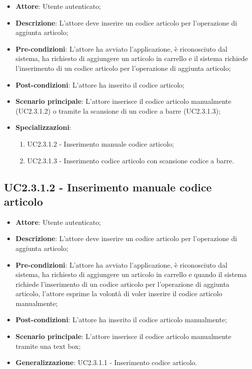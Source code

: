 \begin{itemize}
	\item \textbf{Attore}: Utente autenticato;
	\item \textbf{Descrizione}: L'attore deve inserire un codice articolo per l'operazione di aggiunta articolo;
	\item \textbf{Pre-condizioni}: L'attore ha avviato l'applicazione, è riconosciuto dal sistema, ha richiesto di aggiungere un articolo in carrello e il sistema richiede l'inserimento di un codice articolo per l'operazione di aggiunta articolo;
	\item \textbf{Post-condizioni}: L'attore ha inserito il codice articolo;
	\item \textbf{Scenario principale}: L'attore inserisce il codice articolo manualmente (UC2.3.1.2) o tramite la scansione di un codice a barre (UC2.3.1.3);
	\item \textbf{Specializzazioni}: 
		\begin{enumerate}
			\item UC2.3.1.2 - Inserimento manuale codice articolo;
			\item UC2.3.1.3 - Inserimento codice articolo con scansione codice a barre.
		\end{enumerate}		 
\end{itemize}

\subsection{UC2.3.1.2 - Inserimento manuale codice articolo}

\begin{itemize}
	\item \textbf{Attore}: Utente autenticato;
	\item \textbf{Descrizione}: L'attore deve inserire un codice articolo per l'operazione di aggiunta articolo;
	\item \textbf{Pre-condizioni}: L'attore ha avviato l'applicazione, è riconosciuto dal sistema, ha richiesto di aggiungere un articolo in carrello e quando il sistema richiede l'inserimento di un codice articolo per l'operazione di aggiunta articolo, l'attore esprime la volontà di voler inserire il codice articolo manualmente;
	\item \textbf{Post-condizioni}: L'attore ha inserito il codice articolo manualmente;
	\item \textbf{Scenario principale}: L'attore inserisce il codice articolo manualmente tramite una text box;
	\item \textbf{Generalizzazione}: UC2.3.1.1 - Inserimento codice articolo.
\end{itemize}

